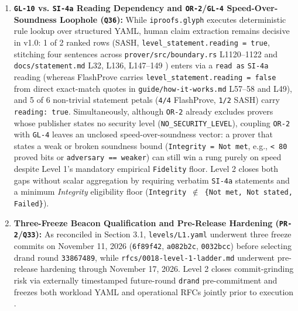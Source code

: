 \documentclass[11pt,letterpaper]{article}
\begin{document}
\begin{enumerate}
\item \textbf{\texttt{GL-10} vs. \texttt{SI-4a} Reading Dependency and \texttt{OR-2}/\texttt{GL-4} Speed-Over-Soundness Loophole (\texttt{Q36}):} While \texttt{iproofs.\allowbreak{}glyph} executes deterministic rule lookup over structured YAML, human claim extraction remains decisive in v1.0: 1 of 2 ranked rows (SASH, \texttt{level\_\allowbreak{}statement.\allowbreak{}reading = true}, stitching four sentences across \texttt{prover/\allowbreak{}src/\allowbreak{}boundary.\allowbreak{}rs} L1120--1122 and \texttt{docs/\allowbreak{}statement.\allowbreak{}md} L32, L136, L147--149 \cite{sash2026}) enters via a \texttt{read as} \texttt{SI-4a} reading (whereas FlashProve carries \texttt{level\_\allowbreak{}statement.\allowbreak{}reading = false} from direct exact-match quotes in \texttt{guide/\allowbreak{}how-\allowbreak{}it-\allowbreak{}works.\allowbreak{}md} L57--58 and L49), and 5 of 6 non-trivial statement petals (\texttt{4/\allowbreak{}4} FlashProve, \texttt{1/\allowbreak{}2} SASH) carry \texttt{reading: true}. Simultaneously, although \texttt{OR-2} already excludes provers whose publisher states no security level (\texttt{NO\_\allowbreak{}SECURITY\_\allowbreak{}LEVEL}), coupling \texttt{OR-2} with \texttt{GL-4} leaves an unclosed speed-over-soundness vector: a prover that states a weak or broken soundness bound (\texttt{Integrity = Not met}, e.g., \texttt{< 80} proved bits or \texttt{adversary == weaker}) can still win a rung purely on speed despite Level 1's mandatory empirical \texttt{Fidelity} floor. Level 2 closes both gaps without scalar aggregation by requiring verbatim \texttt{SI-4a} statements and a minimum \textit{Integrity} eligibility floor (\texttt{Integrity $\notin$ \{Not met, Not stated, Failed\}}).
\item \textbf{Three-Freeze Beacon Qualification and Pre-Release Hardening (\texttt{PR-2}/\texttt{Q33}):} As reconciled in Section 3.1, \texttt{levels/\allowbreak{}L1.\allowbreak{}yaml} underwent three freeze commits on November 11, 2026 (\texttt{6f89f42}, \texttt{a082b2c}, \texttt{0032bcc}) before selecting drand round \texttt{33867489}, while \texttt{rfcs/\allowbreak{}0018-\allowbreak{}level-1-\allowbreak{}ladder.\allowbreak{}md} underwent pre-release hardening through November 17, 2026. Level 2 closes commit-grinding risk via externally timestamped future-round \texttt{drand} pre-commitment and freezes both workload YAML and operational RFCs jointly prior to execution \cite{iproofs2026}.
\end{enumerate}
\end{document}
